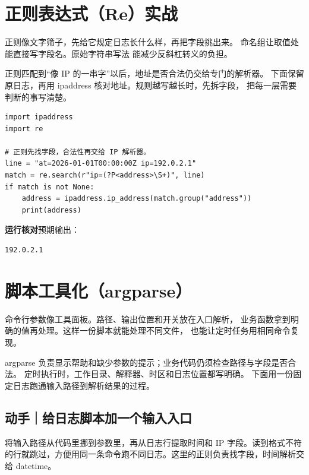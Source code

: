 \documentclass[UTF8,a4paper,oneside,openany,fontset=none,11pt]{ctexbook}
\newcommand{\code}[1]{\texttt{\detokenize{#1}}}
\begin{document}
\par


\section[正则表达式实战]{正则表达式（Re）实战}

正则像文字筛子，先给它规定日志长什么样，再把字段挑出来。
命名组让取值处能直接写字段名。原始字符串写法 \code{r"..."} 能减少反斜杠转义的负担。

正则匹配到“像 IP 的一串字”以后，地址是否合法仍交给专门的解析器。
下面保留原日志，再用 ipaddress 核对地址。规则越写越长时，先拆字段，
把每一层需要判断的事写清楚。


\begin{lstlisting}[title={\code{parse_address.py}}]
import ipaddress
import re

# 正则先找字段，合法性再交给 IP 解析器。
line = "at=2026-01-01T00:00:00Z ip=192.0.2.1"
match = re.search(r"ip=(?P<address>\S+)", line)
if match is not None:
    address = ipaddress.ip_address(match.group("address"))
    print(address)
\end{lstlisting}


\textbf{运行核对}\enspace 预期输出：
\begin{lstlisting}[language={},numbers=none]
192.0.2.1
\end{lstlisting}

\par


\section[脚本工具化]{脚本工具化（argparse）}

命令行参数像工具面板。路径、输出位置和开关放在入口解析，
业务函数拿到明确的值再处理。这样一份脚本就能处理不同文件，
也能让定时任务用相同命令复现。

argparse 负责显示帮助和缺少参数的提示；业务代码仍须检查路径与字段是否合法。
定时执行时，工作目录、解释器、时区和日志位置都写明确。
下面用一份固定日志跑通输入路径到解析结果的过程。

\subsection*{动手｜给日志脚本加一个输入入口}

将输入路径从代码里挪到参数里，再从日志行提取时间和 IP 字段。读到格式不符的行就跳过，方便用同一条命令跑不同日志。这里的正则负责找字段，时间解析交给 datetime。
\end{document}
